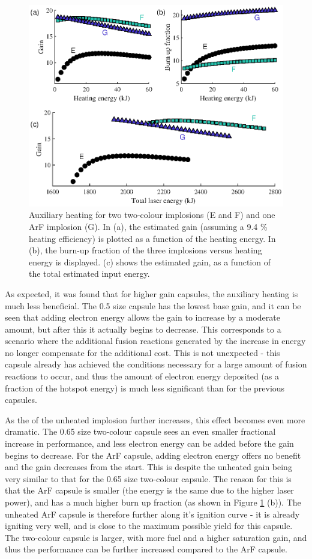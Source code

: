 \begin{figure}[ht]
\centering
\includegraphics{figures/FurtherSims/TwoColourAux.eps}
\caption{Auxiliary heating for two two-colour implosions (E and F) and one ArF implosion (G). In (a), the estimated gain (assuming a 9.4 \% heating efficiency) is plotted as a function of the heating energy. In (b), the burn-up fraction of the three implosions versus heating energy is displayed. (c) shows the estimated gain, as a function of the total estimated input energy.}
\label{fig:TwoColourAux}
\end{figure}

As expected, it was found that for higher gain capsules, the auxiliary heating is much less beneficial. The 0.5 size capsule has the lowest base gain, and it can be seen that adding electron energy allows the gain to increase by a moderate amount, but after this it actually begins to decrease. This corresponds to a scenario where the additional fusion reactions generated by the increase in energy no longer compensate for the additional cost. This is not unexpected - this capsule already has achieved the conditions necessary for a large amount of fusion reactions to occur, and thus the amount of electron energy deposited (as a fraction of the hotspot energy) is much less significant than for the previous capsules.

As the of the unheated implosion further increases, this effect becomes even more dramatic. The 0.65 size two-colour capsule sees an even smaller fractional increase in performance, and less electron energy can be added before the gain begins to decrease. For the ArF capsule, adding electron energy offers no benefit and the gain decreases from the start. This is despite the unheated gain being very similar to that for the 0.65 size two-colour capsule. The reason for this is that the ArF capsule is smaller (the energy is the same due to the higher laser power), and has a much higher burn up fraction (as shown in Figure \ref{fig:TwoColourAux} (b)). The unheated ArF capsule is therefore further along it's ignition curve - it is already igniting very well, and is close to the maximum possible yield for this capsule. The two-colour capsule is larger, with more fuel and a higher saturation gain, and thus the performance can be further increased compared to the ArF capsule.


